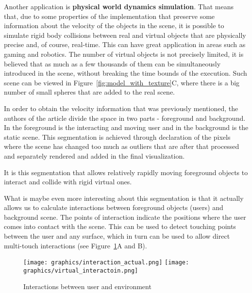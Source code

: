 \documentclass[12pt]{article}
\theoremstyle{plain}
\begin{document}
  Another application is \textbf{physical world dynamics simulation}. That means
  that, due to some properties of the implementation that preserve some
  information about the velocity of the objects in the scene, it is possible to
  simulate rigid body collisions between real and virtual objects that are
  physically precise and, of course, real-time. This can have great application
  in areas such as gaming and robotics. The number of virtual objects is not
  precisely limited, it is believed that as much as a few thousands of them can
  be simultaneously introduced in the scene, without breaking the time bounds of
  the execution. Such scene can be viewed in
  Figure~\ref{fig:model_with_texture}C, where there is a big number of small
  spheres that are added to the real scene.

  In order to obtain the velocity information that was previously mentioned, the
  authors of the article divide the space in two parts - foreground and
  background. In the foreground is the interacting and moving user and in the
  background is the static scene. This segmentation is achieved through
  declaration of the pixels where the scene has changed too much as outliers
  that are after that processed and separately rendered and added in the final
  visualization. 

  It is this segmentation that allows relatively rapidly moving foreground
  objects to interact and collide with rigid virtual ones. 

  What is maybe even more interesting about this segmentation is that it
  actually allows us to calculate interactions between foreground objects
  (users) and background scene. The points of interaction indicate the positions
  where the user comes into contact with the scene. This can be used to detect
  touching points between the user and any surface, which in turn can be used to
  allow direct multi-touch interactions (see Figure~\ref{fig:interactions}A and
  B).

  \begin{figure}[h]
    \centering
    \caption{Interactions between user and environment}
    \texttt{[image: graphics/interaction\_actual.png]}
    \texttt{[image: graphics/virtual\_interactoin.png]}
    \label{fig:interactions}
  \end{figure}
\end{document}
